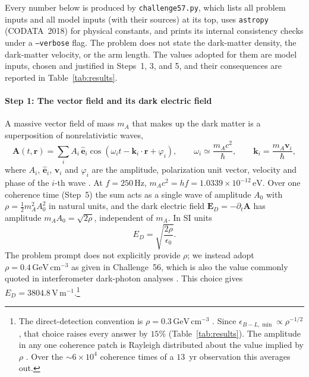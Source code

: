 Every number below is produced by \texttt{challenge57.py}, which lists all problem inputs and all model inputs (with their sources) at its top, uses \texttt{astropy} (CODATA~2018) for physical constants, and prints its internal consistency checks under a \texttt{--verbose} flag. The problem does not state the dark-matter density, the dark-matter velocity, or the arm length. The values adopted for them are model inputs, chosen and justified in Steps~1, 3, and 5, and their consequences are reported in Table~\ref{tab:results}.

\paragraph*{Step 1: The vector field and its dark electric field}
A massive vector field of mass $m_A$ that makes up the dark matter is a superposition of nonrelativistic waves,
%
\begin{equation}
\mathbf A(t,\mathbf r)=\sum_i A_i\,\hat{\mathbf e}_i\cos(\omega_it-\mathbf k_i\cdot\mathbf r+\varphi_i),\qquad \omega_i\simeq\frac{m_Ac^2}{\hbar},\qquad \mathbf k_i=\frac{m_A\mathbf v_i}{\hbar},
\label{eq:field}
\end{equation}
%
where $A_i$, $\hat{\mathbf e}_i$, $\mathbf v_i$ and $\varphi_i$ are the amplitude, polarization unit vector, velocity and phase of the $i$-th wave \citep{Pierce2018,Morisaki2021}. At $f=250\,\mathrm{Hz}$, $m_Ac^2=hf=1.0339\times10^{-12}\,\mathrm{eV}$. Over one coherence time (Step~5) the sum acts as a single wave of amplitude $A_0$ with $\rho=\tfrac12m_A^2A_0^2$ in natural units, and the dark electric field $\mathbf E_D=-\partial_t\mathbf A$ has amplitude $m_AA_0=\sqrt{2\rho}$, independent of $m_A$. In SI units
%
\begin{equation}
E_D=\sqrt{\frac{2\rho}{\epsilon_0}} .
\label{eq:ED}
\end{equation}
%
The problem prompt does not explicitly provide $\rho$; we instead adopt $\rho=0.4\,\mathrm{GeV\,cm^{-3}}$ as given in Challenge~56, which is also the value commonly quoted in interferometer dark-photon analyses \citep{Pierce2018,Guo2019,Morisaki2021}. This choice gives $E_D=3804.8\,\mathrm{V\,m^{-1}}$.\footnote{The direct-detection convention is $\rho=0.3\,\mathrm{GeV\,cm^{-3}}$ \citep{LewinSmith1996,Baxter2021}. Since $\epsilon_{B-L,\min}\propto\rho^{-1/2}$, that choice raises every answer by $15\%$ (Table~\ref{tab:results}). The amplitude in any one coherence patch is Rayleigh distributed about the value implied by $\rho$ \citep{Centers2021}. Over the $\sim6\times10^{4}$ coherence times of a $13$~yr observation this averages out.}

